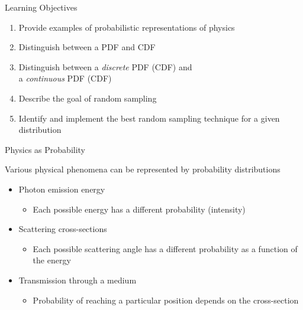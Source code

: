\documentclass[xcolor=x11names,compress, handouts]{beamer}
\renewcommand{\(}{\begin{columns}}
\renewcommand{\)}{\end{columns}}
\newcommand{\<}[1]{\begin{column}{#1}}
\renewcommand{\>}{\end{column}}
\begin{document}
\begin{frame}{Learning Objectives}

    \begin{enumerate}
    \item Provide examples of probabilistic
representations of physics
    \item Distinguish between a PDF and CDF
    \item Distinguish between a \textit{discrete} PDF
(CDF) and \\ a \textit{continuous} PDF (CDF)
    \item Describe the goal of random sampling
    \item Identify and implement the best
random sampling technique for a given
distribution
    \end{enumerate}

\end{frame}


\begin{frame}{Physics as Probability}

Various physical phenomena can be
represented by probability distributions

\begin{itemize}
  \item Photon emission energy
    \begin{itemize}
    \item Each possible energy has a different probability
(intensity)
    \end{itemize} 
    \pause
    \vspace*{0.5 em}
  \item Scattering cross-sections
    \begin{itemize}
    \item Each possible scattering angle has a different
probability as a function of the energy
    \end{itemize}
    \pause
    \vspace*{0.5 em}
  \item Transmission through a medium
    \begin{itemize}
    \item Probability of reaching a particular position
depends on the cross-section
    \end{itemize}
\end{itemize}
\end{frame}
\end{document}
